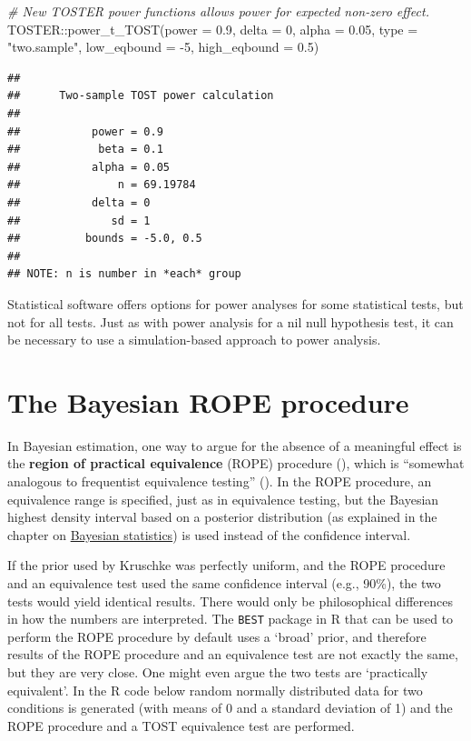 \documentclass[
  oneside]{book}
\newenvironment{Shaded}{\begin{snugshade}}{\end{snugshade}}
\newcommand{\AttributeTok}[1]{\textcolor[rgb]{0.77,0.63,0.00}{#1}}
\newcommand{\CommentTok}[1]{\textcolor[rgb]{0.56,0.35,0.01}{\textit{#1}}}
\newcommand{\DecValTok}[1]{\textcolor[rgb]{0.00,0.00,0.81}{#1}}
\newcommand{\FloatTok}[1]{\textcolor[rgb]{0.00,0.00,0.81}{#1}}
\newcommand{\FunctionTok}[1]{\textcolor[rgb]{0.00,0.00,0.00}{#1}}
\newcommand{\NormalTok}[1]{#1}
\newcommand{\SpecialCharTok}[1]{\textcolor[rgb]{0.00,0.00,0.00}{#1}}
\newcommand{\StringTok}[1]{\textcolor[rgb]{0.31,0.60,0.02}{#1}}
\begin{document}
\begin{Shaded}
\begin{Highlighting}[]
\CommentTok{\# New TOSTER power functions allows power for expected non{-}zero effect.}
\NormalTok{TOSTER}\SpecialCharTok{::}\FunctionTok{power\_t\_TOST}\NormalTok{(}\AttributeTok{power =} \FloatTok{0.9}\NormalTok{, }\AttributeTok{delta =} \DecValTok{0}\NormalTok{,}
                     \AttributeTok{alpha =} \FloatTok{0.05}\NormalTok{, }\AttributeTok{type =} \StringTok{"two.sample"}\NormalTok{,}
                     \AttributeTok{low\_eqbound =} \SpecialCharTok{{-}}\DecValTok{5}\NormalTok{, }\AttributeTok{high\_eqbound =} \FloatTok{0.5}\NormalTok{)}
\end{Highlighting}
\end{Shaded}

\begin{verbatim}
## 
##      Two-sample TOST power calculation 
## 
##           power = 0.9
##            beta = 0.1
##           alpha = 0.05
##               n = 69.19784
##           delta = 0
##              sd = 1
##          bounds = -5.0, 0.5
## 
## NOTE: n is number in *each* group
\end{verbatim}

Statistical software offers options for power analyses for some statistical tests, but not for all tests. Just as with power analysis for a nil null hypothesis test, it can be necessary to use a simulation-based approach to power analysis.

\hypertarget{ROPE}{%
\section{The Bayesian ROPE procedure}\label{ROPE}}

In Bayesian estimation, one way to argue for the absence of a meaningful effect is the \textbf{region of practical equivalence} (ROPE) procedure (\citet{kruschke_bayesian_2013}), which is ``somewhat analogous to frequentist equivalence testing'' (\citet{kruschke_bayesian_2017}). In the ROPE procedure, an equivalence range is specified, just as in equivalence testing, but the Bayesian highest density interval based on a posterior distribution (as explained in the chapter on \protect\hyperlink{bayes}{Bayesian statistics}) is used instead of the confidence interval.

If the prior used by Kruschke was perfectly uniform, and the ROPE procedure and an equivalence test used the same confidence interval (e.g., 90\%), the two tests would yield identical results. There would only be philosophical differences in how the numbers are interpreted. The \texttt{BEST} package in R that can be used to perform the ROPE procedure by default uses a `broad' prior, and therefore results of the ROPE procedure and an equivalence test are not exactly the same, but they are very close. One might even argue the two tests are `practically equivalent'. In the R code below random normally distributed data for two conditions is generated (with means of 0 and a standard deviation of 1) and the ROPE procedure and a TOST equivalence test are performed.
\end{document}

